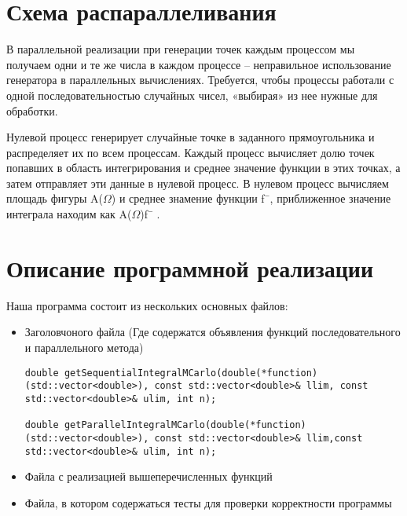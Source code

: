 \documentclass{report}
\begin{document}
\section*{Схема распараллеливания}
В параллельной реализации при генерации точек каждым процессом мы получаем
одни и те же числа в каждом процессе – неправильное использование генератора в
параллельных вычислениях. Требуется, чтобы процессы работали с одной
последовательностью случайных чисел, «выбирая» из нее нужные для обработки. 
\par Нулевой процесс генерирует случайные точке в заданного прямоугольника и
распределяет их по всем процессам. Каждый процесс вычисляет долю точек попавших в
область интегрирования и среднее значение функции в этих точках, а затем отправляет эти
данные в нулевой процесс. В нулевом процесс вычисляем площадь фигуры A($\Omega$) и среднее
знамение функции f¯, приближенное значение интеграла находим как A($\Omega$)f¯ .
\newpage

\section*{Описание программной реализации}
Наша программа состоит из нескольких основных файлов:

\begin{itemize}
\item Заголовчоного файла (Где содержатся объявления функций последовательного и параллельного метода)
\begin{lstlisting}
double getSequentialIntegralMCarlo(double(*function)(std::vector<double>), const std::vector<double>& llim, const std::vector<double>& ulim, int n);

double getParallelIntegralMCarlo(double(*function)(std::vector<double>), const std::vector<double>& llim,const std::vector<double>& ulim, int n);
\end{lstlisting}
\item Файла с реализацией вышеперечисленных функций
\item Файла, в котором содержаться тесты для проверки корректности программы
\end{itemize}


\newpage

\end{document}
